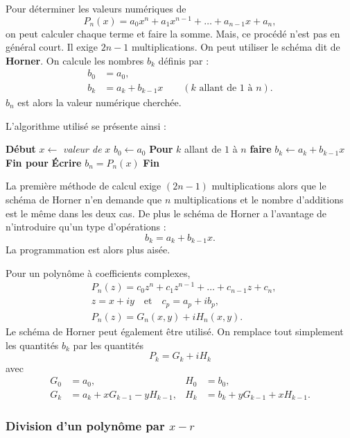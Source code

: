 Pour déterminer les valeurs numériques de
\[
  P_n(x) = a_0x^n + a_1x^{n-1} + \dots + a_{n-1}x + a_n ,
\]
on peut calculer chaque terme et faire la somme. Mais, ce procédé n'est pas en
général court. Il exige $2n-1$ multiplications. On peut utiliser le schéma dit
de \textbf{Horner}. On calcule les nombres $b_k$ définis par :
\[
  \begin{aligned}
    b_0 &= a_0,\\
    b_k &= a_k + b_{k-1}x \qquad (k \text{ allant de } 1 \text{ à } n).
  \end{aligned}
\]
$b_n$ est alors la valeur numérique cherchée.

L'algorithme utilisé se présente ainsi :

\begin{algo}
  \State \textbf{Début}
  \State \quad $x \leftarrow$ \textit{valeur de} $x$
  \State \quad $b_0 \leftarrow a_0$
  \State \quad \textbf{Pour} $k$ allant de $1$ à $n$ \textbf{faire}
  \State \quad\quad $b_k \leftarrow a_k + b_{k-1}x$
  \State \quad \textbf{Fin pour}
  \State \quad \textbf{Écrire} $b_n = P_n(x)$
  \State \textbf{Fin}
\end{algo}

La première méthode de calcul exige $(2n-1)$ multiplications alors que le
schéma de Horner n'en demande que $n$ multiplications et le nombre d'additions
est le même dans les deux cas. De plus le schéma de Horner a l'avantage de
n'introduire qu'un type d'opérations :
\[
  b_k = a_k + b_{k-1}x .
\]
La programmation est alors plus aisée.

Pour un polynôme à coefficients complexes,
\[
  \begin{aligned}
    &P_n(z) = c_0z^n + c_1z^{n-1} + \dots + c_{n-1}z + c_n,\\
    &z = x + iy \quad\text{et}\quad c_p = a_p + ib_p,\\
    &P_n(z) = G_n(x,y) + iH_n(x,y).
  \end{aligned}
\]
Le schéma de Horner peut également être utilisé. On remplace tout simplement
les quantités $b_k$ par les quantités
\[
  P_k = G_k + iH_k
\]
avec
\[
  \begin{aligned}
    G_0 &= a_0, & H_0 &= b_0,\\
    G_k &= a_k + xG_{k-1} - yH_{k-1}, &
    H_k &= b_k + yG_{k-1} + xH_{k-1}.
  \end{aligned}
\]

\subsubsection{Division d'un polynôme par \texorpdfstring{$x-r$}{x-r}}

